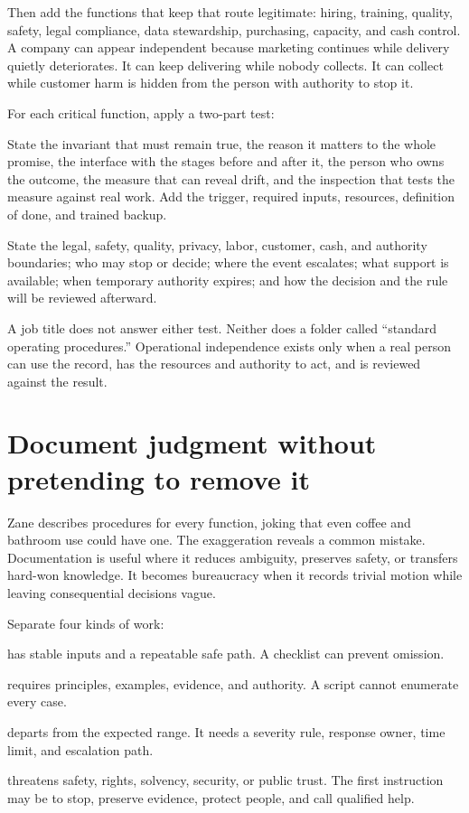Then add the functions that keep that route legitimate: hiring, training,
quality, safety, legal compliance, data stewardship, purchasing, capacity, and
cash control. A company can appear independent because marketing continues
while delivery quietly deteriorates. It can keep delivering while nobody
collects. It can collect while customer harm is hidden from the person with
authority to stop it.

For each critical function, apply a two-part test:

\begin{description}[leftmargin=2.7em,style=nextline,itemsep=0.28em]
\item[Expected work] State the invariant that must remain true, the reason it
  matters to the whole promise, the interface with the stages before and after
  it, the person who owns the outcome, the measure that can reveal drift, and
  the inspection that tests the measure against real work. Add the trigger,
  required inputs, resources, definition of done, and trained backup.
\item[Unexpected condition] State the legal, safety, quality, privacy, labor,
  customer, cash, and authority boundaries; who may stop or decide; where the
  event escalates; what support is available; when temporary authority expires;
  and how the decision and the rule will be reviewed afterward.
\end{description}

A job title does not answer either test. Neither does a folder called
``standard operating procedures.'' Operational independence exists only when a
real person can use the record, has the resources and authority to act, and is
reviewed against the result.

\section{Document judgment without pretending to remove it}

Zane describes procedures for every function, joking that even coffee and
bathroom use could have one. The exaggeration reveals a common mistake.
Documentation is useful where it reduces ambiguity, preserves safety, or
transfers hard-won knowledge. It becomes bureaucracy when it records trivial
motion while leaving consequential decisions vague.

Separate four kinds of work:

\begin{description}[leftmargin=2.6em,style=nextline]
\item[Routine] has stable inputs and a repeatable safe path. A checklist can
  prevent omission.
\item[Judgment] requires principles, examples, evidence, and authority. A script
  cannot enumerate every case.
\item[Exception] departs from the expected range. It needs a severity rule,
  response owner, time limit, and escalation path.
\item[Emergency] threatens safety, rights, solvency, security, or public trust.
  The first instruction may be to stop, preserve evidence, protect people, and
  call qualified help.
\end{description}

